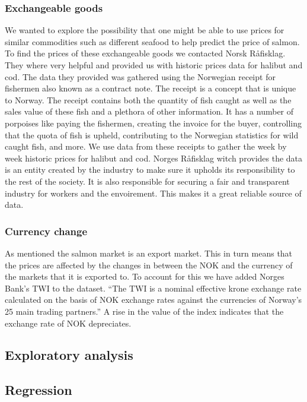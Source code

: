 \subsubsection{Exchangeable goods}\label{Exchangeable goods}
We wanted to explore the possibility that one might be able to use prices for similar commodities such as different seafood to help predict the price of salmon. To find the prices of these exchangeable goods we contacted Norsk Råfisklag. They where very helpful and provided us with historic prices data for halibut and cod. The data they provided was gathered using the Norwegian receipt for fishermen also known as a contract note. The receipt is a concept that is unique to Norway. The receipt contains both the quantity of fish caught as well as the sales value of these fish and a plethora of other information. It has a number of porpoises like paying the fishermen, creating the invoice for the buyer, controlling that the quota of fish is upheld, contributing to the Norwegian statistics for wild caught fish, and more. We use data from these receipts to gather the week by week historic prices for halibut and cod. Norges Råfisklag witch provides the data is an entity created by the industry to make sure it upholds its responsibility to the rest of the society. It is also responsible for securing a fair and transparent industry for workers and the envoirement. This makes it a great reliable source of data.\parencite{Harland_2022}

\subsubsection{Currency change}\label{Currency change}
As mentioned the salmon market is an export market. This in turn means that the prices are affected by the changes in between the NOK and the currency of the markets that it is exported to. To account for this we have added Norges Bank's TWI to the dataset. ``The TWI is a nominal effective krone exchange rate calculated on the basis of NOK exchange rates against the currencies of Norway's 25 main trading partners.'' \parencite{norges_bank_2020} A rise in the value of the index indicates that the exchange rate of NOK depreciates.

\subsection{Exploratory analysis}

\subsection{Regression}

